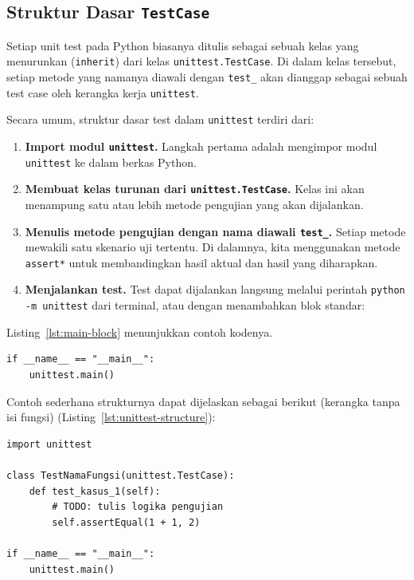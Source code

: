 \subsection{Struktur Dasar \texttt{TestCase}}

Setiap unit test pada Python biasanya ditulis sebagai sebuah kelas yang menurunkan (\texttt{inherit}) dari kelas \texttt{unittest.TestCase}.  
Di dalam kelas tersebut, setiap metode yang namanya diawali dengan \texttt{test\_} akan dianggap sebagai sebuah test case oleh kerangka kerja \texttt{unittest}.

Secara umum, struktur dasar test dalam \texttt{unittest} terdiri dari:

\begin{enumerate}
    \item \textbf{Import modul \texttt{unittest}.}  
    Langkah pertama adalah mengimpor modul \texttt{unittest} ke dalam berkas Python.

    \item \textbf{Membuat kelas turunan dari \texttt{unittest.TestCase}.}  
    Kelas ini akan menampung satu atau lebih metode pengujian yang akan dijalankan.

    \item \textbf{Menulis metode pengujian dengan nama diawali \texttt{test\_}.}  
    Setiap metode mewakili satu skenario uji tertentu.  
    Di dalamnya, kita menggunakan metode \texttt{assert*} untuk membandingkan hasil aktual dan hasil yang diharapkan.

    \item \textbf{Menjalankan test.}  
    Test dapat dijalankan langsung melalui perintah \texttt{python -m unittest} dari terminal, atau dengan menambahkan blok standar:
\end{enumerate}

Listing~\ref{lst:main-block} menunjukkan contoh kodenya.

\begin{lstlisting}[style=PythonStyle, caption={Blok eksekusi test bawaan}, label={lst:main-block}]
if __name__ == "__main__":
    unittest.main()
\end{lstlisting}

Contoh sederhana strukturnya dapat dijelaskan sebagai berikut (kerangka tanpa isi fungsi) (Listing~\ref{lst:unittest-structure}):

\begin{lstlisting}[style=PythonStyle, caption={Struktur dasar kelas unit test di Python}, label={lst:unittest-structure}]
import unittest

class TestNamaFungsi(unittest.TestCase):
    def test_kasus_1(self):
        # TODO: tulis logika pengujian
        self.assertEqual(1 + 1, 2)

if __name__ == "__main__":
    unittest.main()
\end{lstlisting}

